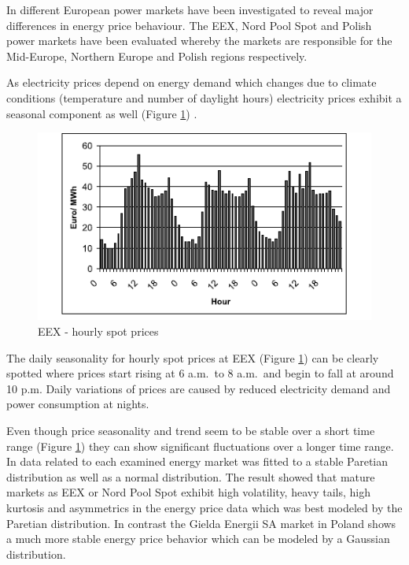 In \cite{mugele2005stable} different European power markets have been investigated to reveal major differences in energy price behaviour. The EEX, Nord Pool Spot and Polish power markets have been evaluated whereby the markets are responsible for the Mid-Europe, Northern Europe and Polish regions respectively. 

As electricity prices depend on energy demand which changes due to climate conditions (temperature and number of daylight hours) electricity prices exhibit a seasonal component as well (Figure \ref{fig:seasonal_behaviour_of_eex_prices}) \cite{weron2005forecasting}. 

\begin{figure}[htbp]
	\centering
		\includegraphics{figures/state_of_the_art/seasonal_behaviour_of_eex_prices.PNG}
	\caption{EEX - hourly spot prices \cite{mugele2005stable}}
	\label{fig:seasonal_behaviour_of_eex_prices}
\end{figure}

The daily seasonality for hourly spot prices at EEX (Figure \ref{fig:seasonal_behaviour_of_eex_prices}) can be clearly spotted where prices 
start rising at 6 a.m.~to 8 a.m.~and begin to fall at around 10 p.m. Daily variations of prices are caused by reduced electricity demand and power consumption at nights. 

Even though price seasonality and trend seem to be stable over a short time range (Figure \ref{fig:seasonal_behaviour_of_eex_prices}) they can show significant fluctuations over a longer time range. In \cite{mugele2005stable} data related to each examined energy market was fitted to a stable Paretian distribution as well as a normal distribution. The result showed that mature markets as EEX or Nord Pool Spot exhibit high volatility, heavy tails, high kurtosis and asymmetrics in the energy price data which was best modeled by the Paretian distribution. In contrast the Gielda Energii SA market in Poland shows a much more stable energy price behavior which can be modeled by a Gaussian distribution. 


